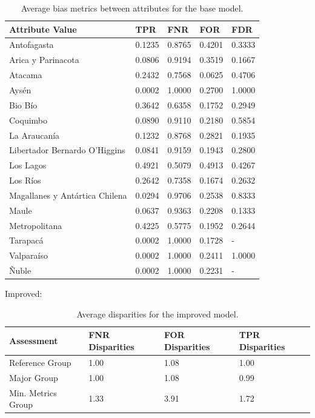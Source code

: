 \documentclass[fleqn,10pt]{wlscirep}
\begin{document}
\begin{table}[ht]
\centering
\begin{tabular}{|p{3.5cm}|p{1cm}|p{1cm}|p{1cm}|p{1cm}|}
\hline

               \textbf{Attribute Value} &    \textbf{TPR} &    \textbf{FNR} &    \textbf{FOR} &    \textbf{FDR} \\ \hline

                   Antofagasta & 0.1235 & 0.8765 & 0.4201 & 0.3333 \\
            Arica y Parinacota & 0.0806 & 0.9194 & 0.3519 & 0.1667 \\
                       Atacama & 0.2432 & 0.7568 & 0.0625 & 0.4706 \\
                         Aysén & 0.0002 & 1.0000 & 0.2700 & 1.0000 \\
                       Bio Bío & 0.3642 & 0.6358 & 0.1752 & 0.2949 \\
                      Coquimbo & 0.0890 & 0.9110 & 0.2180 & 0.5854 \\
                  La Araucanía & 0.1232 & 0.8768 & 0.2821 & 0.1935 \\
 Libertador Bernardo O'Higgins & 0.0841 & 0.9159 & 0.1943 & 0.2800 \\
                     Los Lagos & 0.4921 & 0.5079 & 0.4913 & 0.4267 \\
                      Los Ríos & 0.2642 & 0.7358 & 0.1674 & 0.2632 \\
Magallanes y Antártica Chilena & 0.0294 & 0.9706 & 0.2538 & 0.8333 \\
                         Maule & 0.0637 & 0.9363 & 0.2208 & 0.1333 \\
                 Metropolitana & 0.4225 & 0.5775 & 0.1952 & 0.2644 \\
                      Tarapacá & 0.0002 & 1.0000 & 0.1728 &     - \\
                    Valparaíso & 0.0002 & 1.0000 & 0.2411 & 1.0000 \\
                         Ñuble & 0.0002 & 1.0000 & 0.2231 &     - \\

\hline
\end{tabular}
\caption{Average bias metrics between attributes for the base model.}
\end{table}


Improved:

\begin{table}[!htb]
\centering
\begin{tabular}{|p{70pt}|p{2cm}|p{2cm}|p{2cm}|}
\hline
        \textbf{Assessment} & \textbf{FNR \break Disparities} & \textbf{FOR \break Disparities} & \textbf{TPR \break Disparities} \\ \hline
        Reference Group & 1.00 & 1.08 & 1.00   \\ 
        Major Group & 1.00 & 1.08 & 0.99  \\ 
        Min. Metrics Group & 1.33 & 3.91 & 1.72 \\ 
        \hline
    \end{tabular}
\caption{Average disparities for the improved model.}
\end{table}
\end{document}
